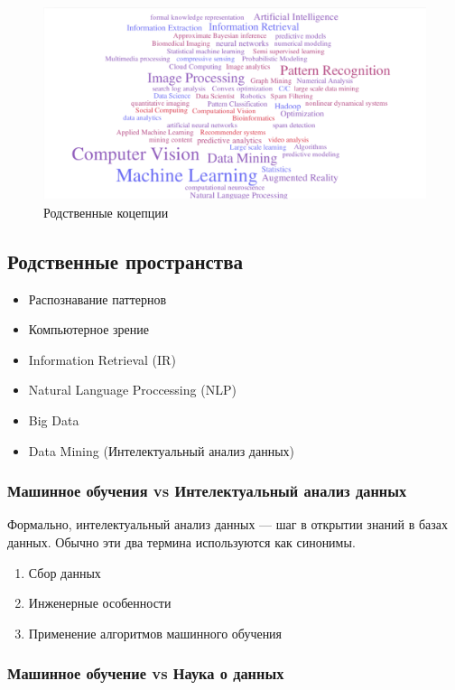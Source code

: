 \documentclass[10pt,a4paper,oneside,titlepage]{report}
\theoremstyle{defenition}
\theoremstyle{theorem}
\begin{document}
\begin{figure}[h!]
	\centering
	\includegraphics[width=0.7\linewidth]{pictures/RelatedConcepts}
	\caption{Родственные коцепции}
	\label{fig:relatedconcepts}
\end{figure}

\subsection{Родственные пространства}
\begin{itemize}
	\item Распознавание паттернов
	\item Компьютерное зрение
	\item Information Retrieval (IR)
	\item Natural Language Proccessing (NLP)
	\item Big Data
	\item Data Mining (Интелектуальный анализ данных)
\end{itemize}

\subsubsection{Машинное обучения vs Интелектуальный анализ данных}

Формально, интелектуальный анализ данных --- шаг в открытии знаний в базах данных. Обычно эти два термина используются как синонимы.

\begin{enumerate}
	\item Сбор данных
	\item Инженерные особенности
	\item Применение алгоритмов машинного обучения
\end{enumerate}

\subsubsection{Машинное обучение vs Наука о данных}
\end{document}
